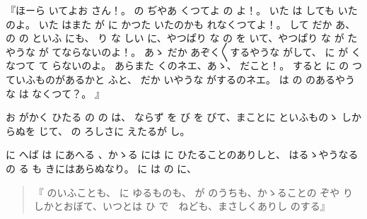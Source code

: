 『ほーら
いてよお
さん！。
の
ぢやあ
くつてよ
の
よ！。
いた
は
しても
いたのよ。
いた
はまた
が
に
かつた
いたのかも
れなくつてよ！。
して
だか
あ、
の
の
といふ
にも、
り
な
しい
に、やつぱり
な
の
を
いて、やつぱり
な
が
たやうな
が
てならないのよ！。
あゝ
だか
あぞく〳〵するやうな
がして、
に
が
くなつて
て
らないのよ。
あらまた
くのネエ、あゝ、
だこと！。
すると
に
の
つていふものがあるかと
ふと、
だか
いやうな
がするのネエ。
は
の
のあるやうな
は
なくつて？。
』

お
がかく
ひたる
の
の
は、
ならず
を
び
を
びて、まことに
といふものゝ
しからぬを
じて、
の
ろしさに
えたるが
し。

に
へば
は
にあへる
、かゝる
には
に
ひたることのありしと、
はるゝやうなる
の
る
も
きにはあらぬなり。
に
は
の
に、

\begin{quote}
『
のいふことも、
に
ゆるものも、
が
のうちも、かゝることの
ぞや
りしかとおぼて、いつとは
ひ
で　ねども、まさしくありし
のする』
\end{quote}

